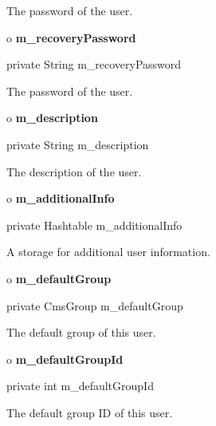 \begin{description}
\htmlDD The password of the user.

\end{description}

o {\bf m\_recoveryPassword} 

\begin{PRE}
 private String m\_recoveryPassword
\end{PRE}

\begin{description}
\htmlDD The password of the user.

\end{description}

o {\bf m\_description} 

\begin{PRE}
 private String m\_description
\end{PRE}

\begin{description}
\htmlDD The description of the user.

\end{description}

o {\bf m\_additionalInfo} 

\begin{PRE}
 private Hashtable m\_additionalInfo
\end{PRE}

\begin{description}
\htmlDD A storage for additional user information.

\end{description}

o {\bf m\_defaultGroup} 

\begin{PRE}
 private CmsGroup m\_defaultGroup
\end{PRE}

\begin{description}
\htmlDD The default group of this user.

\end{description}

o {\bf m\_defaultGroupId} 

\begin{PRE}
 private int m\_defaultGroupId
\end{PRE}

\begin{description}
\htmlDD The default group ID of this user.

\end{description}

